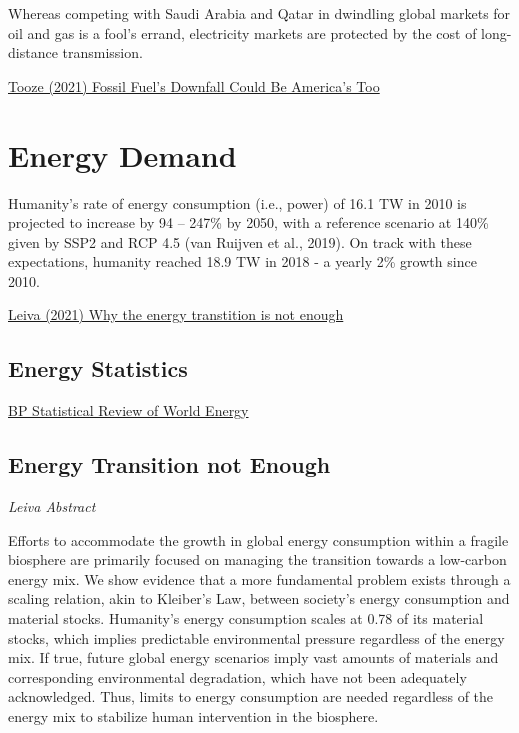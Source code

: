 \documentclass[
]{book}
\begin{document}
Whereas competing with Saudi Arabia and Qatar in dwindling global markets for oil and gas is a fool's errand, electricity markets are protected by the cost of long-distance transmission.

\href{https://foreignpolicy.com/2021/12/03/fossil-fuels-downfall-could-be-americas-too/}{Tooze (2021) Fossil Fuel's Downfall Could Be America's Too}

\hypertarget{energy-demand}{%
\chapter{Energy Demand}\label{energy-demand}}

Humanity's rate of energy consumption (i.e., power) of 16.1 TW in 2010 is projected to increase by 94 --
247\% by 2050, with a reference scenario at 140\% given by SSP2 and RCP 4.5 (van Ruijven et al., 2019).
On track with these expectations, humanity reached 18.9 TW in 2018 - a yearly 2\% growth since 2010.

\href{https://www.researchsquare.com/article/rs-66396/v2}{Leiva (2021) Why the energy transtition is not enough}

\hypertarget{energy-statistics}{%
\section{Energy Statistics}\label{energy-statistics}}

\href{https://www.bp.com/en/global/corporate/energy-economics/statistical-review-of-world-energy.html}{BP Statistical Review of World Energy}

\hypertarget{energy-transition-not-enough}{%
\section{Energy Transition not Enough}\label{energy-transition-not-enough}}

\emph{Leiva Abstract}

Efforts to accommodate the growth in global energy consumption within a fragile biosphere are primarily
focused on managing the transition towards a low-carbon energy mix. We show evidence that a more
fundamental problem exists through a scaling relation, akin to Kleiber's Law, between society's energy
consumption and material stocks. Humanity's energy consumption scales at 0.78 of its material stocks,
which implies predictable environmental pressure regardless of the energy mix. If true, future global
energy scenarios imply vast amounts of materials and corresponding environmental degradation, which
have not been adequately acknowledged. Thus, limits to energy consumption are needed regardless of
the energy mix to stabilize human intervention in the biosphere.
\end{document}
